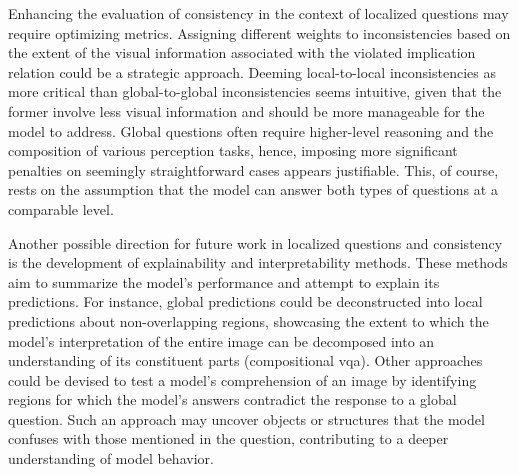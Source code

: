 Enhancing the evaluation of consistency in the context of localized questions may require optimizing metrics. Assigning different weights to inconsistencies based on the extent of the visual information associated with the violated implication relation could be a strategic approach. Deeming local-to-local inconsistencies as more critical than global-to-global inconsistencies seems intuitive, given that the former involve less visual information and should be more manageable for the model to address. Global questions often require higher-level reasoning and the composition of various perception tasks, hence, imposing more significant penalties on seemingly straightforward cases appears justifiable. This, of course, rests on the assumption that the model can answer both types of questions at a comparable level.

Another possible direction for future work in localized questions and consistency is the development of explainability and interpretability methods. These methods aim to summarize the model's performance and attempt to explain its predictions. For instance, global predictions could be deconstructed into local predictions about non-overlapping regions, showcasing the extent to which the model's interpretation of the entire image can be decomposed into an understanding of its constituent parts (compositional \gls{vqa}). Other approaches could be devised to test a model's comprehension of an image by identifying regions for which the model's answers contradict the response to a global question. Such an approach may uncover objects or structures that the model confuses with those mentioned in the question, contributing to a deeper understanding of model behavior.
